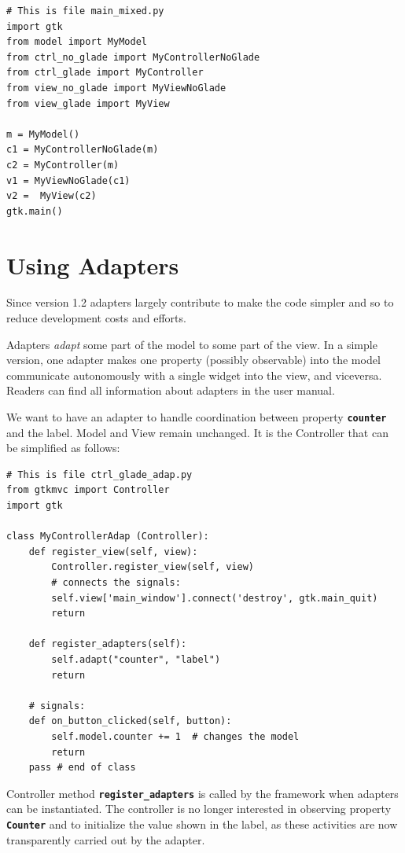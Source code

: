 \documentclass{article}
\newcommand{\codename}[1]{\texttt{\bfseries \textcolor {codecolor}{#1}}\xspace}
\newcommand{\codesize}{\small } %
\begin{document}
{ \codesize 
\begin{verbatim}       
# This is file main_mixed.py
import gtk
from model import MyModel
from ctrl_no_glade import MyControllerNoGlade
from ctrl_glade import MyController
from view_no_glade import MyViewNoGlade
from view_glade import MyView

m = MyModel()
c1 = MyControllerNoGlade(m)
c2 = MyController(m)
v1 = MyViewNoGlade(c1)
v2 =  MyView(c2)
gtk.main()
\end{verbatim}
}


\section{Using Adapters}
Since version 1.2 adapters largely contribute to make the code
simpler and so to reduce development costs and efforts.

\smallskip
Adapters \emph{adapt} some part of the model to some part of the
view. In a simple version, one adapter makes one property (possibly
observable) into the model communicate autonomously with a single
widget into the view, and viceversa. Readers can find all
information about adapters in the user manual.

\bigskip
We want to have an adapter to handle coordination between property
\codename{counter} and the label. Model and View remain
unchanged. It is the Controller that can be simplified as follows:

{ \codesize 
\begin{verbatim}   
# This is file ctrl_glade_adap.py
from gtkmvc import Controller
import gtk

class MyControllerAdap (Controller):
    def register_view(self, view):
        Controller.register_view(self, view)
        # connects the signals:
        self.view['main_window'].connect('destroy', gtk.main_quit)
        return

    def register_adapters(self):
        self.adapt("counter", "label")
        return
       
    # signals:
    def on_button_clicked(self, button):
        self.model.counter += 1  # changes the model
        return    
    pass # end of class
\end{verbatim}
} 

Controller method \codename{register\_adapters} is called by the
framework when adapters can be instantiated. The controller is no
longer interested in observing property \codename{Counter} and to
initialize the value shown in the label, as these activities are now
transparently carried out by the adapter.
\end{document}

